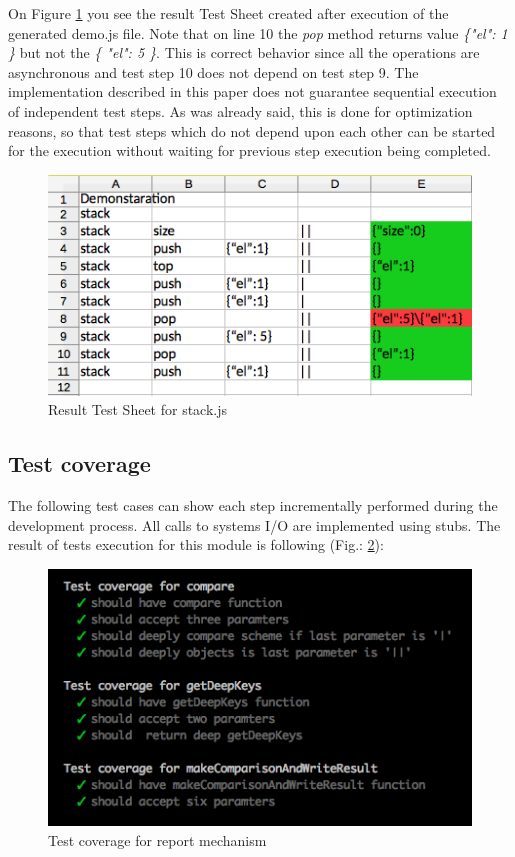 {On Figure \ref{fig:resultTestSheet} you see the result Test Sheet created after execution of the generated demo.js file. Note that on line 10 the \textit{pop} method returns value \textit{\{"el": 1 \}} but not the \textit{\{ "el": 5 \}}. This is correct behavior since all the operations are asynchronous and test step 10 does not depend on test step 9. The implementation described in this paper does not guarantee sequential execution of independent test steps. As was already said, this is done for optimization reasons, so that test steps which do not depend upon each other can be started for the execution without waiting for previous step execution being completed. 
\begin{figure}[H]
	\centering
	\includegraphics[width=\linewidth]{grafiken/testSheetResult.png}
	\caption{Result Test Sheet for stack.js}
	\label{fig:resultTestSheet}
\end{figure}


\subsection{Test coverage}
The following test cases can show each step incrementally performed during the development process. All calls to systems I/O are implemented using stubs.
The result of tests execution  for this module is following (Fig.: \ref{fig:testReport}): 
\begin{figure}[H]
	\centering
	\includegraphics[width=\linewidth]{grafiken/testReport.png}
	\caption{Test coverage for report mechanism}
	\label{fig:testReport}
\end{figure}

}
